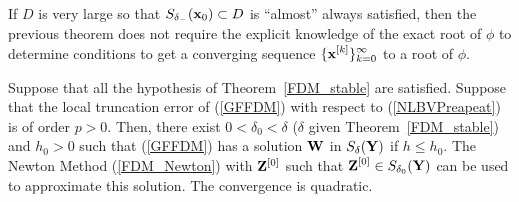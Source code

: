 If $D$ is very large so that $S_{\delta_-}(\mathbf{x}_0) \subset D$ is
``almost'' always satisfied, then the previous theorem does
not require the explicit knowledge of the exact root of $\phi$ to
determine conditions to get a converging sequence
$\displaystyle \{ \mathbf{x}^{[k]}\}_{k=0}^\infty$ to a root of $\phi$.

\begin{theorem}
Suppose that all the hypothesis of Theorem~\ref{FDM_stable} are
satisfied.  Suppose that the local truncation error of (\ref{GFFDM})
with respect to (\ref{NLBVPreapeat}) is of order $p>0$.  Then, there exist
$0 <\delta_0 < \delta$ ($\delta$ given Theorem~\ref{FDM_stable})
and $h_0 >0$ such that (\ref{GFFDM}) has a solution $\mathbf{W}$ in
$S_\delta(\mathbf{Y})$ if $h\leq h_0$.  The Newton Method
(\ref{FDM_Newton}) with $\mathbf{Z}^{[0]}$ such that
$\displaystyle \mathbf{Z}^{[0]} \in S_{\delta_0}(\mathbf{Y})$
can be used to approximate this solution.  The convergence is quadratic.
\end{theorem}

